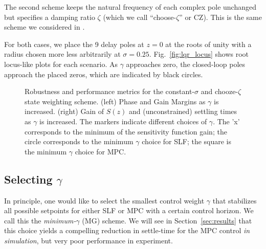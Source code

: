 \documentclass[twocolumn,twoside]{IEEEtran}
\begin{document}
The second scheme keeps the natural frequency of each complex pole unchanged but specifies a damping ratio $\zeta$ (which we call ``choose-$\zeta$'' or CZ). This is the same scheme we considered in \cite{braker_fast_2017, braker_application_2017}.

For both cases, we place the 9 delay poles at $z=0$ at the roots of unity with a radius chosen more less arbitrarily at ${\sigma=0.25}$. Fig.~\ref{fig:lqr_locus} shows root locus-like plots for each scenario. As $\gamma$ approaches zero, the closed-loop poles approach the placed zeros, which are indicated by black circles. 

\begin{figure*}
  \begin{subfigure}[t]{0.48\textwidth}
    
    \caption{}
    \label{fig:gmpm}
  \end{subfigure}
  \hfil
  \begin{subfigure}[t]{0.48\textwidth}
    
    \caption{}
    \label{fig:GainS}
  \end{subfigure}
  \caption{Robustness and performance metrics for the constant-$\sigma$ and chooze-$\zeta$ state weighting scheme. (left) Phase and Gain Margins as $\gamma$ is increased. (right) Gain of $S(z)$ and (unconstrained) settling times as $\gamma$ is increased. The markers indicate different choices of $\gamma$. The 'x' corresponds to the minimum of the sensitivity function gain; the circle corresponds to the minimum $\gamma$ choice for SLF; the square is the minimum $\gamma$ choice for MPC.}
  \label{fig:robmetrics}
\end{figure*}

\subsection{Selecting $\gamma$}
In principle, one would like to select the smallest control weight $\gamma$ that stabilizes all possible setpoints for either SLF or MPC with a certain control horizon. We call this the \emph{minimum-$\gamma$} (MG) scheme. We will see in Section~\ref{sec:results} that this choice yields a compelling reduction in settle-time for the MPC control \emph{in simulation}, but very poor performance in experiment.
\end{document}
